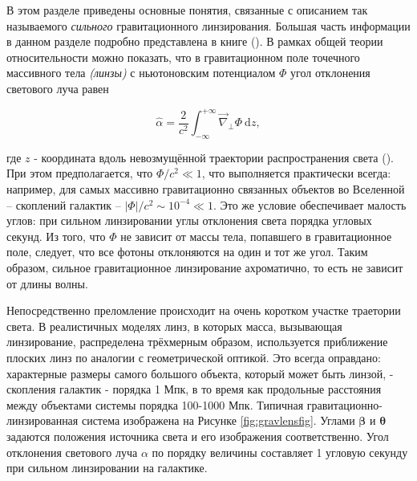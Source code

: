 
 В этом разделе приведены основные понятия, связанные с описанием так называемого \textit{сильного} гравитационного линзирования. Большая часть информации в данном разделе подробно представлена в книге  (\cite{gravlensbook}). В рамках общей теории относительности можно показать, что в гравитационном поле точечного массивного тела \textit{(линзы)} с ньютоновским потенциалом $\Phi$ угол отклонения светового луча равен

\begin{equation}
\hat{\alpha}=\frac{2}{c^{2}} \int_{-\infty}^{+\infty} \vec{\nabla}_{\perp} \Phi \ \mathrm{d} z,
\end{equation}

где $z$ - координата вдоль невозмущённой траектории распространения света (\cite{gl_all}). При этом предполагается, что $\Phi/c^2 \ll 1$, что выполняется практически всегда: например, для самых массивно гравитационно связанных объектов во Вселенной -- скоплений галактик --  $|\Phi|/c^2 \sim 10^{-4} \ll 1$. Это же условие обеспечивает малость углов: при сильном линзировании углы отклонения света порядка угловых секунд. Из того, что $\Phi$ не зависит от массы тела, попавшего в гравитационное поле, следует, что все фотоны отклоняются на один и тот же угол. Таким образом, сильное гравитационное линзирование ахроматично, то есть не зависит от длины волны. 

Непосредственно преломление происходит на очень коротком участке траетории света. В реалистичных моделях линз, в которых масса, вызывающая линзирование, распределена трёхмерным образом, используется приближение плоских линз по аналогии с геометрической оптикой. Это всегда оправдано: характерные размеры самого большого объекта, который может быть линзой, - скопления галактик - порядка 1 Мпк, в то время как продольные расстояния между объектами системы порядка 100-1000 Мпк. Типичная гравитационно-линзированная система изображена на Рисунке \ref{fig:gravlensfig}. Углами $\boldsymbol{\beta}$ и $\boldsymbol{\theta}$ задаются положения источника света и его изображения соответственно. Угол отклонения светового луча $\alpha$ по порядку величины составляет 1 угловую секунду при сильном линзировании на галактике.

